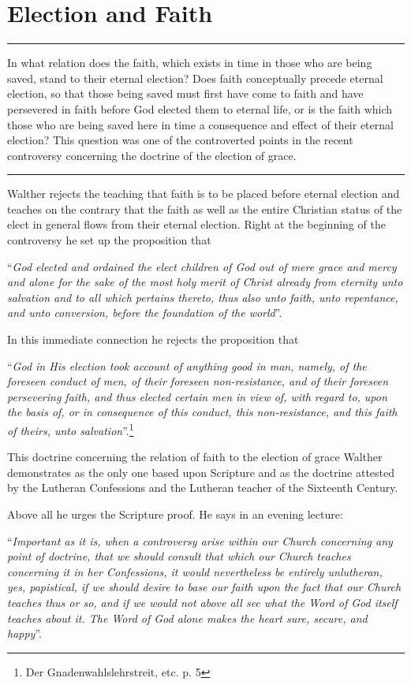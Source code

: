 \chapter{Election and Faith}
\hrule
\vspace{.30cm}
In what relation does the faith, which exists in time in those who are being saved, stand to their eternal election?  Does faith conceptually precede eternal election, so that those being saved must first have come to faith and have persevered in faith before God elected them to eternal life, or is the faith which those who are being saved here in time a consequence and effect of their eternal election?  This question was one of the controverted points in the recent controversy concerning the doctrine of the election of grace.
\vspace{.30cm}
\hrule
\vspace{1.25cm}
                Walther rejects the teaching that faith is to be placed before eternal election and teaches on the contrary that the faith as well as the entire Christian status of the elect in general flows from their eternal election.  Right at the beginning of the controversy he set up the proposition that \begin{displayquote}“\textit{God elected and ordained the elect children of God out of mere grace and mercy and alone for the sake of the most holy merit of Christ already from eternity unto salvation and to all which pertains thereto, thus also unto faith, unto repentance, and unto conversion, before the foundation of the world}”.\end{displayquote}  In this immediate connection he rejects the proposition that \begin{displayquote}“\textit{God in His election took account of anything good in man, namely, of the foreseen conduct of men, of their foreseen non-resistance, and of their foreseen persevering faith, and thus elected certain men in view of, with regard to, upon the basis of, or in consequence of this conduct, this non-resistance, and this faith of theirs, unto salvation}”.\footnote{Der Gnadenwahlslehrstreit, etc. p. 5}\end{displayquote}

                This doctrine concerning the relation of faith to the election of grace Walther demonstrates as the only one based upon Scripture and as the doctrine attested by the Lutheran Confessions and the Lutheran teacher of the Sixteenth Century.

                Above all he urges the Scripture proof.  He says in an evening lecture: \begin{displayquote}“\textit{Important as it is, when a controversy arise within our Church concerning any point of doctrine, that we should consult that which our Church teaches concerning it in her Confessions, it would nevertheless be entirely unlutheran, yes, papistical, if we should desire to base our faith upon the fact that our Church teaches thus or so, and if we would not above all see what the Word of God itself teaches about it.  The Word of God alone makes the heart sure, secure, and happy}”.\end{displayquote}

